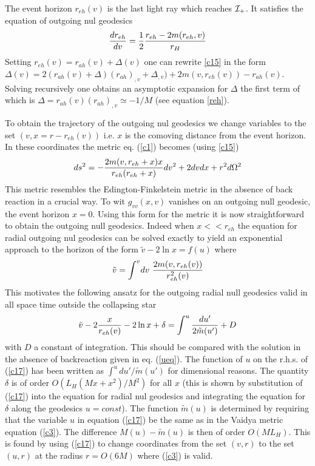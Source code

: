 \documentclass[12pt,oneside]{report}
\begin{document}
The event horizon $r_{eh}(v)$ is the last light ray which
reaches ${\cal I}_+$. It satisfies the equation of
outgoing nul geodesics
\begin{equation}
{dr_{eh} \over dv} = {1 \over 2} { r_{eh} - 2 m(r_{eh}, v)
\over r_H}
\label{c15}
\end{equation}
Setting $r_{eh} (v) = r_{ah}(v) + \Delta(v)$ one can rewrite
\ref{c15} in the form $\Delta(v) = 2(r_{ah}(v) + \Delta) (r_{ah})_{,v} +
\Delta_{,v}) + 2m(v, r_{eh} (v)) - r_{ah}(v)$. Solving recursively one
obtains an asymptotic expansion for $\Delta$ the first term of
which is $\Delta = r_{ah}(v) (r_{ah})_{,v} \simeq -1/M$ 
(see equation \ref{reh}). 

To obtain the trajectory of the outgoing nul geodesics we change
variables to the set $(v, x = r - r_{eh}(v))$ i.e. $x$ is the 
comoving distance from the
event horizon. In these coordinates the metric eq. (\ref{c1})
becomes
(using \ref{c15})
\begin{equation}
ds^2 = - {2 m(v,r_{eh} + x) x\over r_{eh}(r_{eh} + x)} dv^2
+ 2 dv dx + r^2 d\Omega^2
\label{c16}
\end{equation}
This metric resembles the Edington-Finkelstein metric in the absence of back
reaction in a crucial way. To wit $g_{vv}(x,v)$ vanishes on an outgoing null
geodesic, the event horizon $x=0$. Using this form for the metric it is now
straightforward to obtain the outgoing null geodesics. Indeed
when $x << r_{eh}$  the
equation for radial outgoing nul geodesics can be solved exactly to
yield an exponential approach to the horizon of the form
$\tilde 
v - 2 \ln x = f(u)$ where
\begin{equation} \tilde v = \int^v\!dv\
{2m(v,r_{eh}(v))\over r_{eh}^2(v)} \label{c18}\end{equation}
This motivates the following ansatz for the outgoing radial null
geodesics valid in all space time outside the collapsing star
\begin{eqnarray} \tilde 
v - 2 {x\over r_{eh}(v)} -2  \ln x 
+ \delta = \int ^u{du'\over 2 \tilde m(u')} + D
\label{c17}\end{eqnarray}
with $D$ a constant of integration.
This should be compared with the solution in the absence of
backreaction given in eq. (\ref{ueq}).
The function of $u$ on the r.h.s. of (\ref{c17})
has been written as $\int^u du'/\tilde m(u')$ for dimensional reasons. The quantity
$\delta$ is of order  $O(  L_H (Mx+ x^2) / M^2)$ for all $x$ (this is shown by
substitution of (\ref{c17}) into the equation for radial nul geodesics and
integrating the equation for $\delta$ along the geodesics $u=const$). The
function $\tilde m (u)$ is determined by requiring that the variable $u$ in
equation (\ref{c17}) be the same as  in the Vaidya metric equation (\ref{c3}).
The difference $M(u)-\tilde m(u)$ is then of order $O(M L_H)$. This is found by
using (\ref{c17}) to change coordinates from the set $(v,r)$ to the set
$(u,r)$ at the radius $r=O(6M)$ where (\ref{c3}) is valid. 
\end{document}
